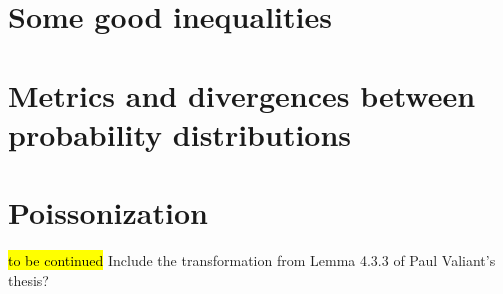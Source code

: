 \documentclass[biber]{nowfnt} %
\newcommand{\tbc}{\noindent\hl{\sc{}to be continued}\xspace}
\newcommand{\tbc}{}
\begin{document}
\appendix

\chapter{Some good inequalities}
  \label{app:inequalities}


\chapter{Metrics and divergences between probability distributions}
  \label{app:distances}


\chapter{Poissonization}
  \label{app:poissonization}
\tbc
Include the transformation from Lemma 4.3.3 of Paul Valiant's thesis?

\backmatter  %

\printbibliography
\end{document}
